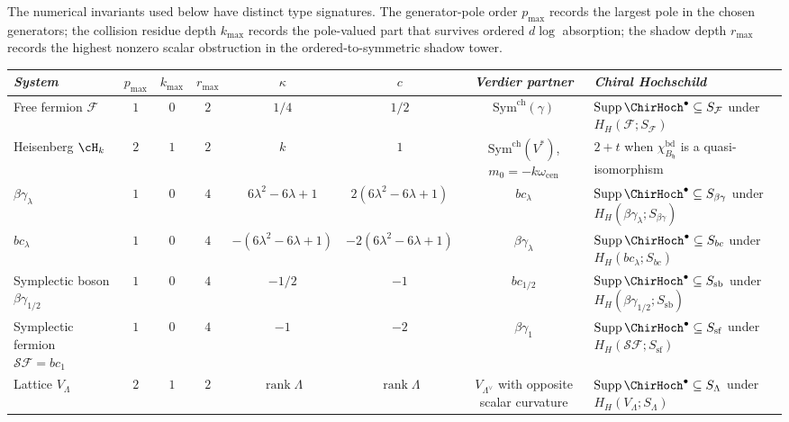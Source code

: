 The numerical invariants used below have distinct type signatures.
The generator-pole order $p_{\max}$ records the largest pole in the
chosen generators; the collision residue depth $k_{\max}$ records the
pole-valued part that survives ordered $d\log$ absorption; the shadow
depth $r_{\max}$ records the highest nonzero scalar obstruction in the
ordered-to-symmetric shadow tower.
\begin{center}
\scriptsize
\renewcommand{\arraystretch}{1.25}
\begin{tabular}{lccccccl}
\toprule
\emph{System} & $p_{\max}$ & $k_{\max}$ & $r_{\max}$ &
$\kappa$ & $c$ & \emph{Verdier partner} & \emph{Chiral Hochschild} \\
\midrule
Free fermion $\mathcal F$ & $1$ & $0$ & $2$ &
$1/4$ & $1/2$ &
$\mathrm{Sym}^{\mathrm{ch}}(\gamma)$ &
$\operatorname{Supp}\ChirHoch^\bullet\subseteq S_{\mathcal F}$ under
$H_H(\mathcal F;S_{\mathcal F})$ \\
Heisenberg $\cH_k$ & $2$ & $1$ & $2$ &
$k$ & $1$ &
$\mathrm{Sym}^{\mathrm{ch}}(V^*)$, $m_0=-k\omega_{\mathrm{cen}}$ &
$2+t$ when $\chi^{\mathrm{bd}}_{B_{\mathfrak h}}$ is a quasi-isomorphism \\
$\beta\gamma_\lambda$ & $1$ & $0$ & $4$ &
$6\lambda^2-6\lambda+1$ & $2(6\lambda^2-6\lambda+1)$ &
$bc_\lambda$ &
$\operatorname{Supp}\ChirHoch^\bullet\subseteq S_{\beta\gamma}$ under
$H_H(\beta\gamma_\lambda;S_{\beta\gamma})$ \\
$bc_\lambda$ & $1$ & $0$ & $4$ &
$-(6\lambda^2-6\lambda+1)$ & $-2(6\lambda^2-6\lambda+1)$ &
$\beta\gamma_\lambda$ &
$\operatorname{Supp}\ChirHoch^\bullet\subseteq S_{bc}$ under
$H_H(bc_\lambda;S_{bc})$ \\
Symplectic boson $\beta\gamma_{1/2}$ & $1$ & $0$ & $4$ &
$-1/2$ & $-1$ &
$bc_{1/2}$ &
$\operatorname{Supp}\ChirHoch^\bullet\subseteq S_{\mathrm{sb}}$ under
$H_H(\beta\gamma_{1/2};S_{\mathrm{sb}})$ \\
Symplectic fermion $\mathcal{SF}=bc_1$ & $1$ & $0$ & $4$ &
$-1$ & $-2$ &
$\beta\gamma_1$ &
$\operatorname{Supp}\ChirHoch^\bullet\subseteq S_{\mathrm{sf}}$ under
$H_H(\mathcal{SF};S_{\mathrm{sf}})$ \\
Lattice $V_\Lambda$ & $2$ & $1$ & $2$ &
$\operatorname{rank}\Lambda$ & $\operatorname{rank}\Lambda$ &
$V_{\Lambda^\vee}$ with opposite scalar curvature &
$\operatorname{Supp}\ChirHoch^\bullet\subseteq S_\Lambda$ under
$H_H(V_\Lambda;S_\Lambda)$ \\
\bottomrule
\end{tabular}
\end{center}
